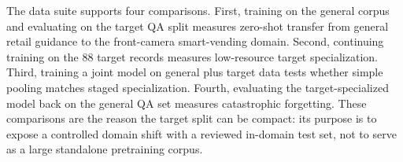 The data suite supports four comparisons. First, training on the general corpus and evaluating on the target QA split measures zero-shot transfer from general retail guidance to the front-camera smart-vending domain. Second, continuing training on the 88 target records measures low-resource target specialization. Third, training a joint model on general plus target data tests whether simple pooling matches staged specialization. Fourth, evaluating the target-specialized model back on the general QA set measures catastrophic forgetting. These comparisons are the reason the target split can be compact: its purpose is to expose a controlled domain shift with a reviewed in-domain test set, not to serve as a large standalone pretraining corpus.
